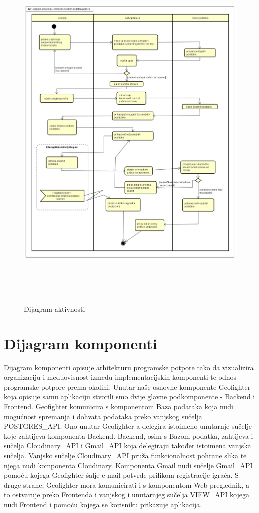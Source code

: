 			\begin{figure}[H]
				\includegraphics[width=\linewidth, height=18cm]{dijagrami/DijagramAktivnosti-v1}				
				\centering
				\caption{Dijagram aktivnosti}
				\label{}
			\end{figure}
			\eject
			
		\section{Dijagram komponenti}
		
		{Dijagram komponenti opisuje arhitekturu programske potpore tako da vizualizira organizaciju i međuovisnost između implementacijskih komponenti te odnos programske potpore prema okolini. Unutar naše osnovne komponente Geofighter koja opisuje samu aplikaciju stvorili smo dvije glavne podkomponente - Backend i Frontend. Geofighter komunicira s komponentom Baza podataka koja nudi mogućnost spremanja i dohvata podataka preko vanjskog sučelja POSTGRES\_API. Ono unutar Geofighter-a delegira istoimeno unutarnje sučelje koje zahtijeva komponenta Backend. Backend, osim s Bazom podatka, zahtijeva i sučelja Cloudinary\_API i Gmail\_API koja delegiraju također istoimena vanjska sučelja. Vanjsko sučelje Cloudinary\_API pruža funkcionalnost pohrane slika te njega nudi komponenta Cloudinary. Komponenta Gmail nudi sučelje Gmail\_API pomoću kojega Geofighter šalje e-mail potvrde prilikom registracije igrača. S druge strane, Geofighter mora komunicirati i s komponentom Web preglednik, a to ostvaruje preko Frontenda i vanjskog i unutarnjeg sučelja VIEW\_API kojega nudi Frontend i pomoću kojega se korisniku prikazuje aplikacija.}
		
